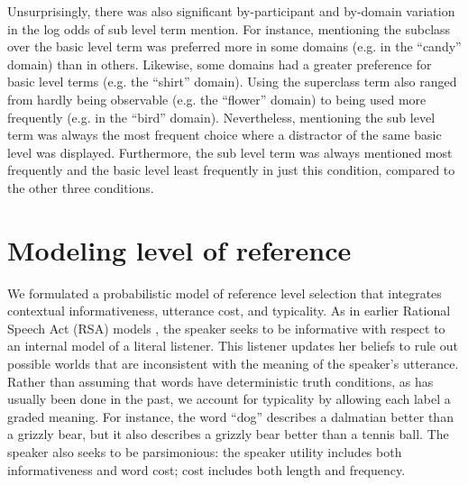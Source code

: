 \documentclass[10pt,letterpaper]{article}
\newcommand{\figref}[1]{Fig.~\ref{#1}}
\begin{document}
%


Unsurprisingly, there was also significant by-participant and by-domain variation in the log odds of sub level term mention. %
For instance, mentioning the subclass over the basic level term was preferred more in some domains (e.g. in the ``candy'' domain) than in others. Likewise, some domains had a greater preference for basic level terms (e.g. the ``shirt'' domain). Using the superclass term also ranged from hardly being observable (e.g. the ``flower'' domain) to being used more frequently (e.g. in the ``bird'' domain). Nevertheless, mentioning the sub level term was always the most frequent choice where a distractor of the same basic level was displayed. Furthermore, the sub level term was always mentioned most frequently and the basic level least frequently in just this condition, compared to the other three conditions.




\section{\bf Modeling level of reference}

We formulated a probabilistic model of reference level selection that integrates contextual informativeness, utterance cost, and typicality.
As in earlier Rational Speech Act (RSA) models \cite{frank2012, goodmanstuhlmueller2013}, the speaker seeks to be informative with respect to an internal model of a literal listener. This listener updates her beliefs to rule out possible worlds that are inconsistent with the meaning of the speaker's utterance. Rather than assuming that words have deterministic truth conditions, as has usually been done in the past, we account for typicality by allowing each label a graded meaning. For instance, the word ``dog'' describes a dalmatian better than a grizzly bear, but it also describes a grizzly bear better than a tennis ball.
The speaker also seeks to be parsimonious: the speaker utility includes both informativeness and word cost; cost includes both length and frequency.
\end{document}
